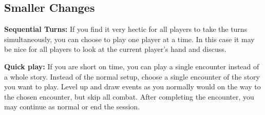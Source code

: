 \subsection*{Smaller Changes} 

\textbf{Sequential Turns:}  If you find it very hectic for all players to take the turns simultaneously, you can choose to play one player at a time. In this case it may be nice for all players to look at the current player's hand and discuss.

\textbf{Quick play:} If you are short on time, you can play a single encounter instead of a whole story. Instead of the normal setup, choose a single encounter of the story you want to play. Level up and draw events as you normally would on the way to the chosen encounter, but skip all combat. After completing the encounter, you may continue as normal or end the session. %

